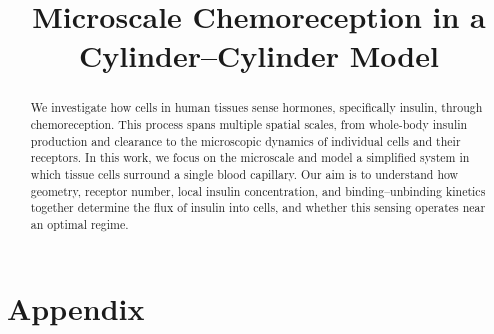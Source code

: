 \documentclass{article}
\title{Microscale Chemoreception in a Cylinder--Cylinder Model}
\begin{document}
\maketitle
\begin{abstract}
We investigate how cells in human tissues sense hormones, specifically insulin, through chemoreception.
This process spans multiple spatial scales, from whole-body insulin production and clearance to the microscopic dynamics of individual cells and their receptors.
In this work, we focus on the microscale and model a simplified system in which tissue cells surround a single blood capillary.
Our aim is to understand how geometry, receptor number, local insulin concentration, and binding--unbinding kinetics together determine the flux of insulin into cells, and whether this sensing operates near an optimal regime.
\end{abstract}








\appendix
\section*{Appendix}



\end{document}
